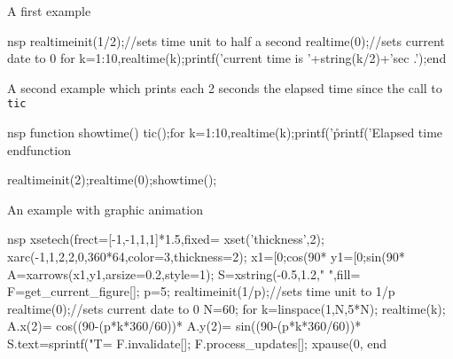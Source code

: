\begin{examples}

\noindent A first example
  \begin{mintednsp}{nsp}
    realtimeinit(1/2);//sets time unit to half a second
    realtime(0);//sets current date to 0
    for k=1:10,realtime(k);printf('current time is '+string(k/2)+'sec .\n');end
  \end{mintednsp}

\noindent A second example which prints each 2 seconds the elapsed time since
the call to \verb!tic!
\begin{mintednsp}{nsp}
  function showtime()
    tic();for k=1:10,realtime(k);printf('\r%
    printf('Elapsed time %
  endfunction

  realtimeinit(2);realtime(0);showtime();
\end{mintednsp}

\noindent An example with graphic animation

\begin{mintednsp}{nsp}
xsetech(frect=[-1,-1,1,1]*1.5,fixed=%
xset('thickness',2);
xarc(-1,1,2,2,0,360*64,color=3,thickness=2);
x1=[0;cos(90*%
y1=[0;sin(90*%
A=xarrows(x1,y1,arsize=0.2,style=1);
S=xstring(-0.5,1.2," ",fill=%
F=get_current_figure[];
p=5;
realtimeinit(1/p);//sets time unit to 1/p
realtime(0);//sets current date to 0
N=60;
for k=linspace(1,N,5*N);
  realtime(k);
  A.x(2)= cos((90-(p*k*360/60))*%
  A.y(2)= sin((90-(p*k*360/60))*%
  S.text=sprintf("T=%
  F.invalidate[];
  F.process_updates[];
  xpause(0,%
end
\end{mintednsp}

\end{examples}
